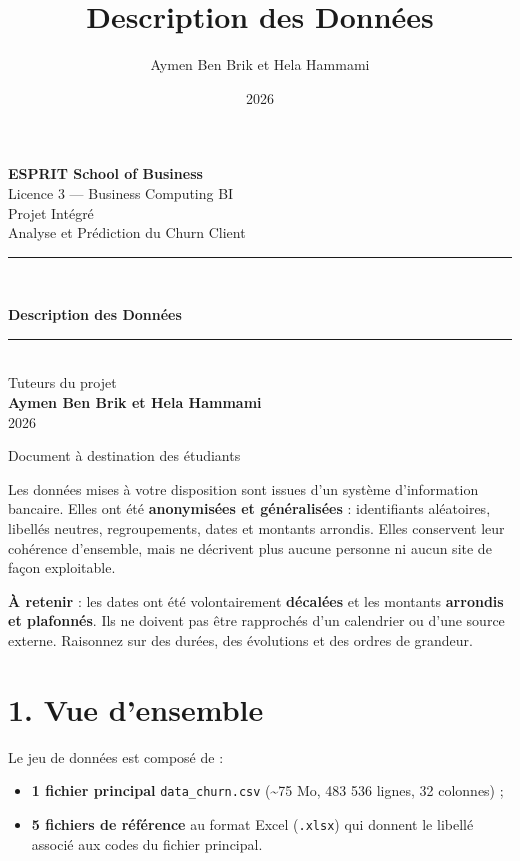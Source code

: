 \documentclass[11pt,a4paper]{article}
\title{\color{primary}\textbf{Description des Données}}
\author{Aymen Ben Brik et Hela Hammami}
\date{2026}
\renewenvironment{quote}{\begin{quotebox}}{\end{quotebox}}
\providecommand{\tightlist}{\setlength{\itemsep}{0pt}\setlength{\parskip}{0pt}}
\begin{document}
\begin{titlepage}
\centering
\vspace*{1.5cm}

{\Large\bfseries ESPRIT School of Business}\\[0.3cm]
{\large Licence 3 --- Business Computing BI}\\[2cm]

{\color{gray}\large Projet Intégré}\\[0.3cm]
{\color{gray}\large Analyse et Prédiction du Churn Client}\\[2.2cm]

\rule{0.85\linewidth}{1.2pt}\\[0.6cm]
{\Huge\bfseries\color{primary} Description des Données\par}
\rule{0.85\linewidth}{1.2pt}\\[2cm]

{\large Tuteurs du projet}\\[0.2cm]
{\Large\bfseries Aymen Ben Brik et Hela Hammami}\\[1cm]
{\large 2026}

\vfill
{\color{gray}\small Document à destination des étudiants}
\end{titlepage}

\tableofcontents
\newpage

Les données mises à votre disposition sont issues d'un système
d'information bancaire. Elles ont été \textbf{anonymisées et
généralisées} : identifiants aléatoires, libellés neutres,
regroupements, dates et montants arrondis. Elles conservent leur
cohérence d'ensemble, mais ne décrivent plus aucune personne ni aucun
site de façon exploitable.

\begin{quote}
\textbf{À retenir} : les dates ont été volontairement \textbf{décalées}
et les montants \textbf{arrondis et plafonnés}. Ils ne doivent pas être
rapprochés d'un calendrier ou d'une source externe. Raisonnez sur des
durées, des évolutions et des ordres de grandeur.
\end{quote}

\section{1. Vue d'ensemble}\label{vue-densemble}

Le jeu de données est composé de :

\begin{itemize}
\tightlist
\item
  \textbf{1 fichier principal} \texttt{data\_churn.csv}
  (\textasciitilde75 Mo, 483 536 lignes, 32 colonnes) ;
\item
  \textbf{5 fichiers de référence} au format Excel (\texttt{.xlsx}) qui
  donnent le libellé associé aux codes du fichier principal.
\end{itemize}
\end{document}

